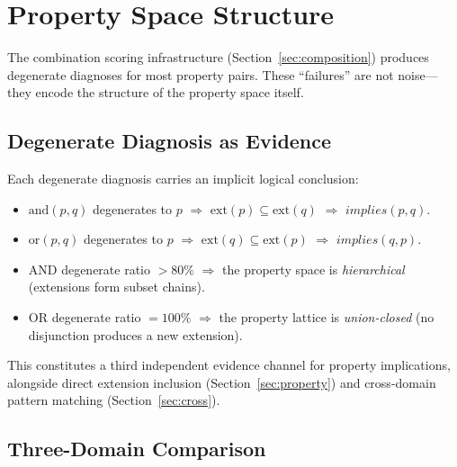 \section{Property Space Structure}
\label{sec:space}

The combination scoring infrastructure (Section~\ref{sec:composition}) produces degenerate diagnoses for most property pairs. These ``failures'' are not noise---they encode the structure of the property space itself.

\subsection{Degenerate Diagnosis as Evidence}

Each degenerate diagnosis carries an implicit logical conclusion:

\begin{itemize}
\item $\text{and}(p, q)$ degenerates to $p$ $\Rightarrow$ $\mathrm{ext}(p) \subseteq \mathrm{ext}(q)$ $\Rightarrow$ $\mathit{implies}(p, q)$.
\item $\text{or}(p, q)$ degenerates to $p$ $\Rightarrow$ $\mathrm{ext}(q) \subseteq \mathrm{ext}(p)$ $\Rightarrow$ $\mathit{implies}(q, p)$.
\item AND degenerate ratio $> 80\%$ $\Rightarrow$ the property space is \emph{hierarchical} (extensions form subset chains).
\item OR degenerate ratio $= 100\%$ $\Rightarrow$ the property lattice is \emph{union-closed} (no disjunction produces a new extension).
\end{itemize}

This constitutes a third independent evidence channel for property implications, alongside direct extension inclusion (Section~\ref{sec:property}) and cross-domain pattern matching (Section~\ref{sec:cross}).

\subsection{Three-Domain Comparison}

